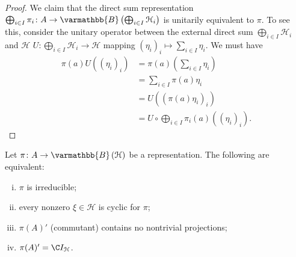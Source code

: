 \documentclass[10pt]{mypackage}
\renewcommand*{\mathbb}[1]{\varmathbb{#1}}
\newcommand{\B}{\mathbb{B}}
\begin{document}
\begin{proof}
  We claim that the direct sum representation $\bigoplus_{i\in I}\pi_i\colon A\rightarrow \B\left(\bigoplus_{i\in I}\mathcal{H}_i\right)$ is unitarily equivalent to $\pi$. To see this, consider the unitary operator between the external direct sum $\bigoplus_{i\in I}\mathcal{H}_i$ and $\mathcal{H}$  $U\colon \bigoplus_{i\in I}\mathcal{H}_i\rightarrow \mathcal{H}$ mapping $\left(\eta_i\right)_{i}\mapsto \sum_{i\in I}\eta_i$. We must have
  \begin{align*}
    \pi(a)U\left(\left(\eta_i\right)_i\right) &= \pi(a)\left(\sum_{i\in I}\eta_i\right)\\
                                              &= \sum_{i\in I}\pi(a)\eta_i\\
                                              &= U\left(\left(\pi(a)\eta_i\right)_i\right)\\
                                              &= U\circ \bigoplus_{i\in I}\pi_i(a)\left(\left(\eta_i\right)_i\right).
  \end{align*}
\end{proof}
\begin{proposition}
  Let $\pi\colon A\rightarrow \B\left(\mathcal{H}\right)$ be a representation. The following are equivalent:
  \begin{enumerate}[(i)]
    \item $\pi$ is irreducible;
    \item every nonzero $\xi\in \mathcal{H}$ is cyclic for $\pi$;
    \item $\pi(A)'$ (commutant) contains no nontrivial projections;
    \item $\pi(A)' = \C I_{\mathcal{H}}$.
  \end{enumerate}
\end{proposition}
\end{document}
